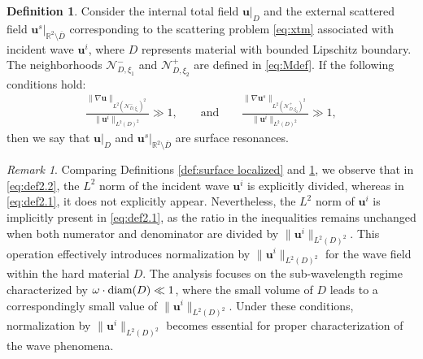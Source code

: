 \documentclass[11pt,reqno,twoside]{amsart}
\theoremstyle{definition}
\newtheorem{defn}{Definition}[section]
\theoremstyle{remark}
\newtheorem{rem}{Remark}[section]
\numberwithin{equation}{section}
\begin{document}
\begin{defn}\label{def:surface resonant}
	Consider the internal total field $\mathbf{u}|_{D}$ and the external scattered field $\mathbf{u}^s|_{\mathbb{R}^2 \setminus \overline{{D}}}$ corresponding to the scattering problem \eqref{eq:xtm} associated with  incident wave $\mathbf{u}^i$, where $D$ represents material with bounded Lipschitz boundary. The neighborhoods $\mathcal{N}_{D,\xi_{1}}^{-} $ and $\mathcal{N}_{D,\xi_{2}}^{+}$ are defined in \eqref{eq:Mdef}. If the following conditions hold: 
	\begin{align}\label{eq:def2.2}
		\frac{\|\nabla \mathbf{u} \|_{L^2(\mathcal{N}_{D,\xi_{1}}^{-})^2}}{\|\mathbf{u}^i\|_{L^2(D)^2} } \gg 1, 
		\qquad \mbox{and} \qquad
		\frac{\|\nabla \mathbf{u}^s \|_{L^2(\mathcal{N}_{D,\xi_{2}}^{+})^2} }{\|\mathbf{u}^i\|_{L^2(D)^2} } \gg 1,
	\end{align}
	then we say that $\mathbf{u}|_{D}$ and $\mathbf{u}^s|_{\mathbb{R}^2 \setminus \overline{{D}}}$ are surface resonances.
\end{defn}
\begin{rem}
	Comparing  Definitions \ref{def:surface localized} and \ref{def:surface resonant}, we observe that in \eqref{eq:def2.2}, the $L^2$ norm of the incident wave $\mathbf{u}^i$   is explicitly divided, whereas in \eqref{eq:def2.1}, it does not explicitly appear. Nevertheless, the $L^2$ norm of $\mathbf{u}^i$ is implicitly present in \eqref{eq:def2.1}, as the ratio in the inequalities remains unchanged when both numerator and denominator are divided by $\|\mathbf{u}^i\|_{L^2(D)^2}$. This operation effectively introduces normalization by $\|\mathbf{u}^i\|_{L^2(D)^2}$ for the wave field within the hard material $D$. The analysis focuses on the sub-wavelength regime characterized by $\omega \cdot {\rm diam} (D) \ll 1$, where the small volume of $D$ leads to a correspondingly small value of $\|\mathbf{u}^i\|_{L^2(D)^2}$. Under these conditions, normalization by $\|\mathbf{u}^i\|_{L^2(D)^2}$ becomes essential for proper characterization of the wave phenomena.
\end{rem}
\end{document}
